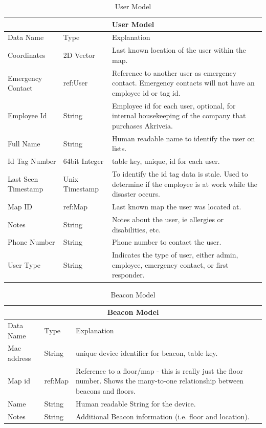 \begin{table}[H]
\centering
\begin{tabular}{| m{3cm} | m{3cm} | m{9.5cm} |}
	\hline
	\multicolumn{3}{|c|}{User Model} \\
	\hline
	Data Name & Type & Explanation \\

	\hline
	Coordinates & 2D Vector & Last known location of the user within the map. \\
	\hline
	Emergency Contact & ref:User & Reference to another user as emergency contact. Emergency contacts will not have an employee id or tag id. \\
	\hline
	Employee Id & String & Employee id for each user, optional, for internal housekeeping of the company that purchases Akriveia. \\
	\hline
	Full Name & String & Human readable name to identify the user on lists. \\
	\hline
	Id Tag Number & 64bit Integer & table key, unique, id for each user. \\
	\hline
	Last Seen Timestamp & Unix Timestamp & To identify the id tag data is stale. Used to determine if the employee is at work while the disaster occurs. \\
	\hline
	Map ID & ref:Map & Last known map the user was located at. \\
	\hline
	Notes & String & Notes about the user, ie allergies or disabilities, etc. \\
	\hline
	Phone Number & String & Phone number to contact the user. \\
	\hline
	User Type & String & Indicates the type of user, either admin, employee, emergency contact, or first responder. \\
	\hline
\end{tabular}
\caption{User Model}
\label{user_model}
\end{table}

\begin{table}[H]
\centering
\begin{tabular}{ | m{3cm} | m{3cm} | m{9.5cm} |}
	\hline
	\multicolumn{3}{|c|}{Beacon Model} \\
	\hline
	Data Name & Type & Explanation \\

	\hline
	Mac address & String & unique device identifier for beacon, table key.\\
	\hline
	Map id & ref:Map & Reference to a floor/map - this is really just the floor number. Shows the many-to-one relationship between beacons and floors. \\
	\hline
	Name & String & Human readable String for the device. \\
	\hline
	Notes & String & Additional Beacon information (i.e. floor and location). \\
	\hline
\end{tabular}
\caption{Beacon Model}
\label{beacon_model}
\end{table}


